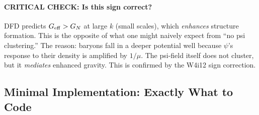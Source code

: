 \documentclass[11pt]{article}
\theoremstyle{definition}
\theoremstyle{remark}
\newcommand{\Geff}{G_{\rm eff}}
\begin{document}
\paragraph{CRITICAL CHECK: Is this sign correct?}
DFD predicts $\Geff > G_N$ at large $k$ (small scales),
which \emph{enhances} structure formation. This is the opposite
of what one might naively expect from ``no psi clustering.'' The
reason: baryons fall in a deeper potential well because $\psi$'s
response to their density is amplified by $1/\mu$. The psi-field
itself does not cluster, but it \emph{mediates} enhanced gravity.
This is confirmed by the W4i12 sign correction.

\subsection{Minimal Implementation: Exactly What to Code}
\end{document}
